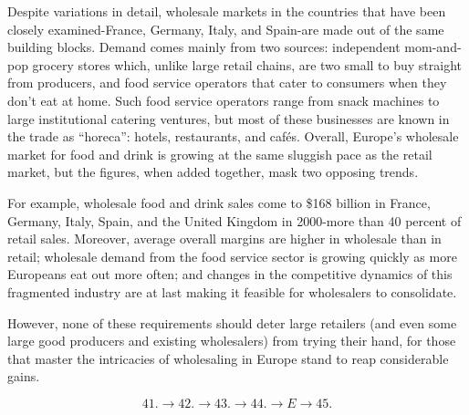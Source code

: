 \qquad [E] Despite variations in detail, wholesale markets in the countries that have been closely examined-France, Germany, Italy, and Spain-are made out of the same building blocks. Demand comes mainly from two sources: independent mom-and-pop grocery stores which, unlike large retail chains, are two small to buy straight from producers, and food service operators that cater to consumers when they don't eat at home. Such food service operators range from snack machines to large institutional catering ventures, but most of these businesses are known in the trade as ``horeca'': hotels, restaurants, and caf\'{e}s. Overall, Europe's wholesale market for food and drink is growing at the same sluggish pace as the retail market, but the figures, when added together, mask two opposing trends.

\qquad [F] For example, wholesale food and drink sales come to \$168 billion in France, Germany, Italy, Spain, and the United Kingdom in 2000-more than 40 percent of retail sales. Moreover, average overall margins are higher in wholesale than in retail; wholesale demand from the food service sector is growing quickly as more Europeans eat out more often; and changes in the competitive dynamics of this fragmented industry are at last making it feasible for wholesalers to consolidate.

\qquad [G] However, none of these requirements should deter large retailers (and even some large good producers and existing wholesalers) from trying their hand, for those that master the intricacies of wholesaling in Europe stand to reap considerable gains.

\[41. \to 42. \to 43. \to 44. \to E \to 45.\]